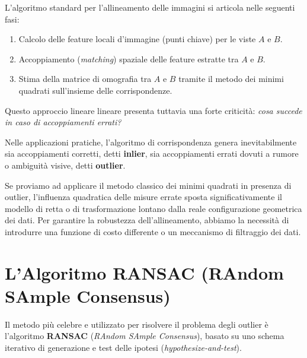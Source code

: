 ﻿\documentclass[11pt, a4paper]{article}
\begin{document}
L'algoritmo standard per l'allineamento delle immagini si articola nelle seguenti fasi:
\begin{enumerate}[noitemsep]
    \item Calcolo delle feature locali d'immagine (punti chiave) per le viste $A$ e $B$.
    \item Accoppiamento (\emph{matching}) spaziale delle feature estratte tra $A$ e $B$.
    \item Stima della matrice di omografia tra $A$ e $B$ tramite il metodo dei minimi quadrati sull'insieme delle corrispondenze.
\end{enumerate}

Questo approccio lineare lineare presenta tuttavia una forte criticità: \emph{cosa succede in caso di accoppiamenti errati?}


Nelle applicazioni pratiche, l'algoritmo di corrispondenza genera inevitabilmente sia accoppiamenti corretti, detti \textbf{inlier}, sia accoppiamenti errati dovuti a rumore o ambiguità visive, detti \textbf{outlier}.


Se proviamo ad applicare il metodo classico dei minimi quadrati in presenza di outlier, l'influenza quadratica delle misure errate sposta significativamente il modello di retta o di trasformazione lontano dalla reale configurazione geometrica dei dati. Per garantire la robustezza dell'allineamento, abbiamo la necessità di introdurre una funzione di costo differente o un meccanismo di filtraggio dei dati.

\newpage

\section{L'Algoritmo RANSAC (RAndom SAmple Consensus)}

Il metodo più celebre e utilizzato per risolvere il problema degli outlier è l'algoritmo \textbf{RANSAC} (\emph{RAndom SAmple Consensus}), basato su uno schema iterativo di generazione e test delle ipotesi (\emph{hypothesize-and-test}).

\end{document}
